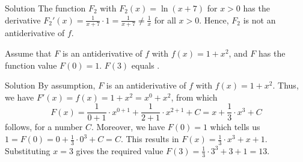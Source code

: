 \begin{MExercises}
\begin{MExercise}
\begin{MHint}{Solution}
The function $F_2$ with $F_2(x) = \ln(x + 7)$ for $x > 0$ has the derivative
$F_2'(x) = \frac{1}{x + 7} \cdot 1 = \frac{1}{x + 7} \neq \frac{1}{x}$ for 
all $x > 0$. Hence, $F_2$ is not an antiderivative of $f$.
%
\end{MHint}
\end{MExercise}

\begin{MExercise}
Assume that $F$ is an antiderivative of $f$ with $f(x)=1 + x^2$, and $F$
has the function value $F(0) = 1$. $F(3)$ equals .
\begin{MHint}{Solution}
By assumption, $F$ is an antiderivative of $f$ with $f(x) = 1 + x^2$. Thus, we have 
 $F'(x) = f(x) = 1 + x^2 = x^0 + x^2$, from which
\[
F(x) = \frac{1}{0 + 1} \cdot x^{0+1} + \frac{1}{2 + 1} \cdot x^{2 + 1} + C %
= x + \frac{1}{3} \cdot x^3 + C %
\]
follows, for a number $C$. Moreover, we have $F(0) = 1$ which tells us
$1 = F(0) = 0 + \frac{1}{3} \cdot 0^3 + C = C$. This results in
$F(x) = \frac{1}{3} \cdot x^3 + x + 1$. Substituting $x = 3$ gives 
the required value $F(3) = \frac{1}{3} \cdot 3^3 + 3 + 1 = 13$.
\end{MHint}
\end{MExercise}

\end{MExercises}





